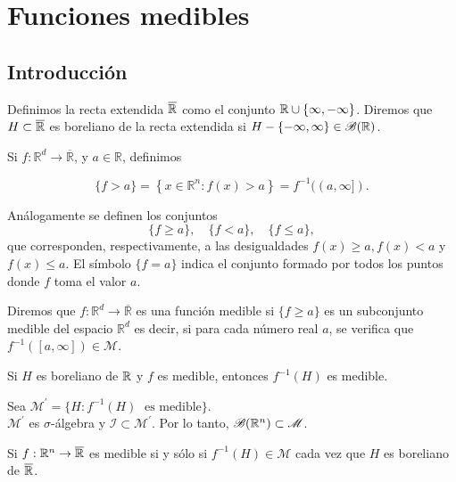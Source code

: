 \chapter{Funciones medibles
}

\section{Introducci\'on}

\begin{definicion}{} Definimos la recta extendida $\overline{\mathbb{R}}$ como el conjunto $\mathbb{R}\cup\{\infty,-\infty\}$. 
Diremos que $H \subset \overline{\mathbb{R}}$ es boreliano de la recta extendida si $H-\{ -\infty, \infty\} \in \mathscr{B}(\mathbb{R})$.
\end{definicion}
 

 Si $f:\mathbb{R}^d\to\overline{\mathbb{R}}$, y  $a\in\mathbb{R}$, definimos
 
$$
\{f>a\}=\left\{x \in \mathbb{R}^n: f(x)>a\right\}=f^{-1}((a, \infty]) .
$$

Análogamente se definen los conjuntos
$$
\{f \geq a\}, \quad\{f<a\}, \quad\{f \leq a\},
$$
que corresponden, respectivamente, a las desigualdades $f(x) \geq a, f(x)<a$ y $f(x) \leq a$. El símbolo $\{f=a\}$ indica el conjunto formado por todos los puntos donde $f$ toma el valor $a$.





\begin{definicion}{}Diremos que $f:\mathbb{R}^d\to\overline{\mathbb{R}}$  es una función medible si $\{f \geq a\}$ es un subconjunto medible del espacio $\mathbb{R}^d$ es decir, si para cada número real $a$, se verifica
 que   $f^{-1}([a,\infty]) \in \mathscr{M}$. 
\end{definicion}

\begin{teorema}{}
Si $H$ es boreliano de $\mathbb{R}$ y $f$ es medible, entonces $f^{-1}(H)$ es medible.
\end{teorema}

\begin{demo}{}
Sea $\mathscr{M}^{'}=\{ H: f^{-1}(H)\;\mbox{ es medible}\}$.\\
$\mathscr{M}^{'}$ es $\sigma$-\'algebra y $\mathscr{I}\subset \mathscr{M}^{'}$.
Por lo tanto, $\mathscr{B}(\mathbb{R}^n) \subset \mathscr{M}$.
\end{demo}



\begin{teorema}{}
Si $f:\mathbb{R}^n \to \overline{\mathbb{R}}$ es medible si y s\'olo si $f^{-1}(H) \in \mathscr{M}$ cada vez que $H$ es boreliano de $\overline{\mathbb{R}}$.
\end{teorema}

